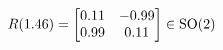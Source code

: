 \documentclass[preview]{standalone}
\begin{document}
\begin{align*}
\special{dvisvgm:raw <g id='unique000'>}R(1.46) = \begin{bmatrix} 0.11 & -0.99 \\ 0.99 & 0.11 \end{bmatrix} \in \text{SO}(2)\special{dvisvgm:raw </g>}
\end{align*}
\end{document}

